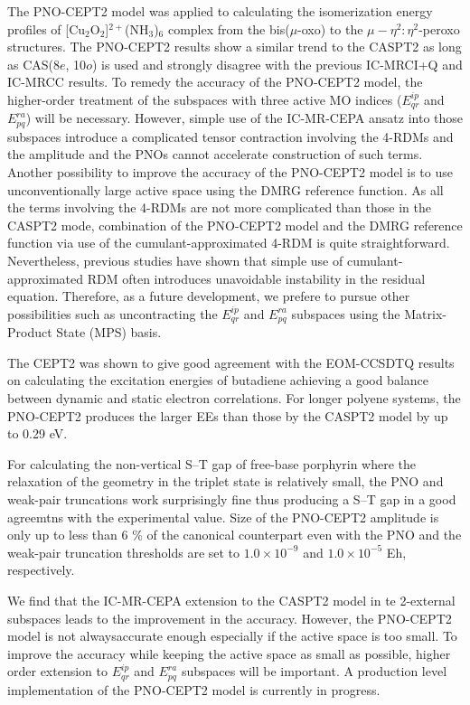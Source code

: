 \documentclass[aip,jcp,amsmath,twocolumn,floatfix,reprint,fleqn]{revtex4-1}
\begin{document}
%
The PNO-CEPT2 model was applied to calculating the isomerization energy profiles of [Cu${}_2$O${}_2$]${}^{2+}$(NH${}_3$)${}_{6}$ complex from the bis($\mu$-oxo) to the $\mu-\eta^2:\eta^2$-peroxo structures.
%
The PNO-CEPT2 results show a similar trend to the CASPT2 as long as CAS(8$e$, 10$o$) is used and strongly disagree with the previous IC-MRCI+Q and IC-MRCC results.
%
To remedy the accuracy of the PNO-CEPT2 model, the higher-order treatment of the subspaces with three active MO indices ($E^{ip}_{qr}$ and $E^{ra}_{pq}$) will be necessary.
%
However, simple use of the IC-MR-CEPA ansatz into those subspaces introduce a complicated tensor contraction involving the 4-RDMs and the amplitude and the PNOs cannot accelerate construction of such terms.
%
Another possibility to improve the accuracy of the PNO-CEPT2 model is to use unconventionally large active space using the DMRG reference function.
%
As all the terms involving the 4-RDMs are not more complicated than those in the CASPT2 mode, combination of the PNO-CEPT2 model and the DMRG reference function via use of the cumulant-approximated 4-RDM is quite straightforward.
%
Nevertheless, previous studies have shown that simple use of cumulant-approximated RDM often introduces unavoidable instability in the residual equation.
%
Therefore, as a future development, we prefere to pursue other possibilities such as uncontracting the $E^{ip}_{qr}$ and $E^{ra}_{pq}$ subspaces using the Matrix-Product State (MPS) basis.

%
The CEPT2 was shown to give good agreement with the EOM-CCSDTQ results on calculating the excitation energies of butadiene achieving a good balance between dynamic and static electron correlations.
%
For longer polyene systems, the PNO-CEPT2 produces the larger EEs than those by the CASPT2 model by up to 0.29 eV.

%
For calculating the non-vertical S--T gap of free-base porphyrin where the relaxation of the geometry in the triplet state is relatively small, the PNO and weak-pair truncations work surprisingly fine thus producing a S--T gap in a good agreemtns with the experimental value.
%
Size of the PNO-CEPT2 amplitude is only up to less than 6 $\%$ of the canonical counterpart even with the PNO and the weak-pair truncation thresholds are set to $1.0\times10^{-9}$ and $1.0\times 10^{-5}$ Eh, respectively.

%
We find that the IC-MR-CEPA extension to the CASPT2 model in te 2-external subspaces leads to the improvement in the accuracy.
%
However, the PNO-CEPT2 model is not alwaysaccurate enough especially if the active space is too small.
%
To improve the accuracy while keeping the active space as small as possible, higher order extension to $E^{ip}_{qr}$ and $E^{ra}_{pq}$ subspaces will be important.
%
A production level implementation of the PNO-CEPT2 model is currently in progress.
\end{document}
